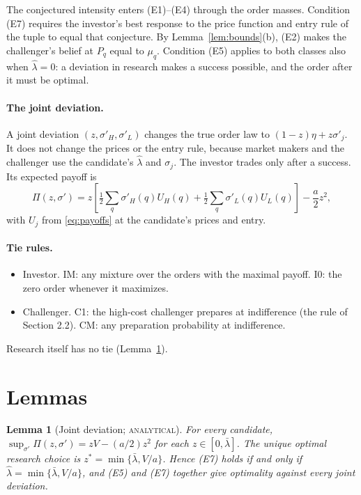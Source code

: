 \documentclass[12pt]{article}
\newtheorem{lemma}{Lemma}
\theoremstyle{definition}
\theoremstyle{remark}
\newcommand{\lh}{\hat\lambda}
\newcommand{\lb}{\bar\lambda}
\newcommand{\st}[1]{\textsc{#1}}
\begin{document}
The conjectured intensity enters (E1)--(E4) through the order masses. Condition (E7) requires the investor's
best response to the price function and entry rule of the tuple to equal that conjecture. By
Lemma~\ref{lem:bounds}(b), (E2) makes the challenger's belief at $P_q$ equal to $\mu_q$. Condition (E5) applies to
both classes also when $\lh=0$: a deviation in research makes a success possible, and the order after it must be
optimal.

\paragraph{The joint deviation.} A joint deviation $(z,\sigma'_H,\sigma'_L)$ changes the true order law to
$(1-z)\eta+z\sigma'_j$. It does not change the prices or the entry rule, because market makers and the challenger
use the candidate's $\lh$ and $\sigma_j$. The investor trades only after a success. Its expected payoff is
\begin{equation}\label{eq:Pi}
\Pi(z,\sigma')=z\left[\tfrac12\sum_q\sigma'_H(q)U_H(q)+\tfrac12\sum_q\sigma'_L(q)U_L(q)\right]-\frac a2z^2 ,
\end{equation}
with $U_j$ from \eqref{eq:payoffs} at the candidate's prices and entry.

\paragraph{Tie rules.}
\begin{itemize}[nosep]
\item Investor. IM: any mixture over the orders with the maximal payoff. I0: the zero order whenever it maximizes.
\item Challenger. C1: the high-cost challenger prepares at indifference (the rule of Section 2.2).
  CM: any preparation probability at indifference.
\end{itemize}
Research itself has no tie (Lemma~\ref{lem:joint}).

\section{Lemmas}\label{sec:lemmas}

\begin{lemma}[Joint deviation; \st{analytical}]\label{lem:joint}
For every candidate, $\sup_{\sigma'}\Pi(z,\sigma')=zV-(a/2)z^2$ for each $z\in[0,\lb]$. The unique optimal
research choice is $z^*=\min\{\lb,V/a\}$. Hence (E7) holds if and only if $\lh=\min\{\lb,V/a\}$, and (E5) and (E7)
together give optimality against every joint deviation.
\end{lemma}
\end{document}
